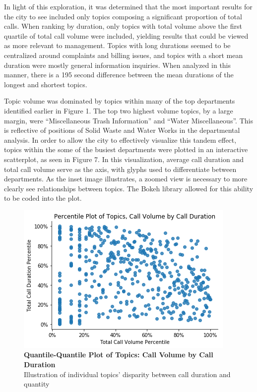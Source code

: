 \documentclass[12pt]{article}
\begin{document}
\par
In light of this exploration, it was determined that the most important results for the city to see included only topics composing a significant proportion of total calls.  When ranking by duration, only topics with total volume above the first quartile of total call volume were included, yielding results that could be viewed as more relevant to management.  Topics with long durations seemed to be centralized around complaints and billing issues, and topics with a short mean duration were mostly general information inquiries.  When analyzed in this manner, there is a 195 second difference between the mean durations of the longest and shortest topics.

\par
Topic volume was dominated by topics within many of the top departments identified earlier in Figure 1.  The top two highest volume topics, by a large margin, were “Miscellaneous Trash Information” and “Water Miscellaneous”.  This is reflective of positions of Solid Waste and Water Works in the departmental analysis.  In order to allow the city to effectively visualize this tandem effect, topics within the some of the busiest departments were plotted in an interactive scatterplot, as seen in Figure 7.  In this visualization, average call duration and total call volume serve as the axis, with glyphs used to differentiate between departments.  As the inset image illustrates, a zoomed view is necessary to more clearly see relationships between topics.  The Bokeh library allowed for this ability to be coded into the plot.


	\begin{figure}
	\includegraphics[scale=.4]{new_q-q_plot.png}
	\caption{\textbf{Quantile-Quantile Plot of Topics: Call Volume by Call Duration} \\
	Illustration of individual topics' disparity between call duration and quantity}
	\end{figure}
\end{document}
